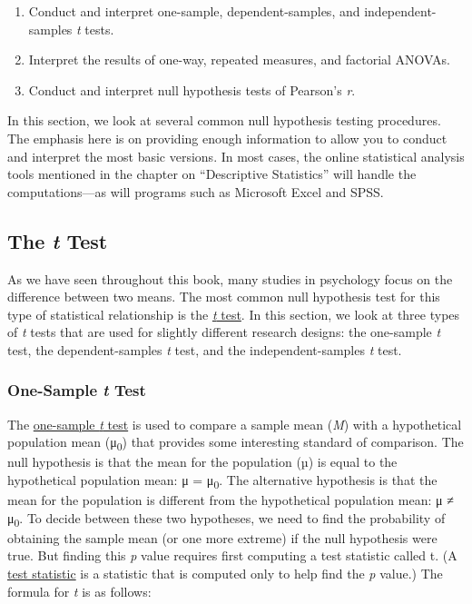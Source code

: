 \documentclass[
]{krantz}
\providecommand{\tightlist}{%
  \setlength{\itemsep}{0pt}\setlength{\parskip}{0pt}}
\begin{document}
\begin{enumerate}
\def\labelenumi{\arabic{enumi}.}
\tightlist
\item
  Conduct and interpret one-sample, dependent-samples, and independent-samples \emph{t} tests.
\item
  Interpret the results of one-way, repeated measures, and factorial ANOVAs.
\item
  Conduct and interpret null hypothesis tests of Pearson's \emph{r}.
\end{enumerate}

In this section, we look at several common null hypothesis testing procedures. The emphasis here is on providing enough information to allow you to conduct and interpret the most basic versions. In most cases, the online statistical analysis tools mentioned in the chapter on ``Descriptive Statistics'' will handle the computations---as will programs such as Microsoft Excel and SPSS.

\hypertarget{the-t-test}{%
\subsection*{\texorpdfstring{The \emph{t} Test}{The t Test}}\label{the-t-test}}


As we have seen throughout this book, many studies in psychology focus on the difference between two means. The most common null hypothesis test for this type of statistical relationship is the \protect\hyperlink{t-test}{\emph{t} test}. In this section, we look at three types of \emph{t} tests that are used for slightly different research designs: the one-sample \emph{t} test, the dependent-samples \emph{t} test, and the independent-samples \emph{t} test.

\hypertarget{one-sample-t-test}{%
\subsubsection*{\texorpdfstring{One-Sample \emph{t} Test}{One-Sample t Test}}\label{one-sample-t-test}}


The \protect\hyperlink{one-sample-t-test-1}{one-sample \emph{t} test} is used to compare a sample mean (\emph{M}) with a hypothetical population mean (μ\textsubscript{0}) that provides some interesting standard of comparison. The null hypothesis is that the mean for the population (µ) is equal to the hypothetical population mean: μ = μ\textsubscript{0}. The alternative hypothesis is that the mean for the population is different from the hypothetical population mean: μ ≠ μ\textsubscript{0}. To decide between these two hypotheses, we need to find the probability of obtaining the sample mean (or one more extreme) if the null hypothesis were true. But finding this \emph{p} value requires first computing a test statistic called t. (A \protect\hyperlink{test-statistic}{test statistic} is a statistic that is computed only to help find the \emph{p} value.) The formula for \emph{t} is as follows:
\end{document}
